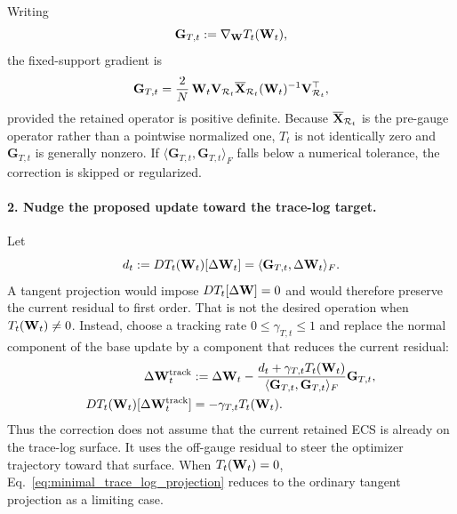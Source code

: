 Writing
\begin{equation}
  \mathbf G_{T,t}
  :=
  \nabla_{\mathbf W}T_t(\mathbf W_t),
  \label{eq:optimizer_trace_log_normal}
\end{equation}
the fixed-support gradient is
\begin{equation}
  \mathbf G_{T,t}
  =
  \frac{2}{N}\,
  \mathbf W_t\mathbf V_{\mathcal R_t}
  \overline{\mathbf X}_{\mathcal R_t}(\mathbf W_t)^{-1}
  \mathbf V_{\mathcal R_t}^{\top},
  \label{eq:optimizer_trace_log_gradient_explicit}
\end{equation}
provided the retained operator is positive definite.  Because $\overline{\mathbf X}_{\mathcal R_t}$ is the pre-gauge operator rather than a pointwise normalized one, $T_t$ is not identically zero and $\mathbf G_{T,t}$ is generally nonzero.  If $\langle\mathbf G_{T,t},\mathbf G_{T,t}\rangle_F$ falls below a numerical tolerance, the correction is skipped or regularized.

\paragraph{2. Nudge the proposed update toward the trace-log target.}
Let
\begin{equation}
  d_t
  :=
  DT_t(\mathbf W_t)[\Delta\mathbf W_t]
  =
  \langle\mathbf G_{T,t},\Delta\mathbf W_t\rangle_F.
  \label{eq:optimizer_trace_log_directional_derivative}
\end{equation}
A tangent projection would impose $DT_t[\Delta\mathbf W]=0$ and would therefore preserve the current residual to first order.  That is not the desired operation when $T_t(\mathbf W_t)\neq0$.  Instead, choose a tracking rate $0\leq\gamma_{T,t}\leq1$ and replace the normal component of the base update by a component that reduces the current residual:
\begin{equation}
\begin{aligned}
  \Delta\mathbf W_t^{\rm track}
  &:=
  \Delta\mathbf W_t
  -
  \frac{
    d_t+\gamma_{T,t}T_t(\mathbf W_t)
  }{
    \langle\mathbf G_{T,t},\mathbf G_{T,t}\rangle_F
  }
  \mathbf G_{T,t},\\
  DT_t(\mathbf W_t)[\Delta\mathbf W_t^{\rm track}]
  &=-\gamma_{T,t}T_t(\mathbf W_t).
\end{aligned}
  \label{eq:minimal_trace_log_projection}
\end{equation}
Thus the correction does not assume that the current retained ECS is already on the trace-log surface.  It uses the off-gauge residual to steer the optimizer trajectory toward that surface.  When $T_t(\mathbf W_t)=0$, Eq.~\eqref{eq:minimal_trace_log_projection} reduces to the ordinary tangent projection as a limiting case.

